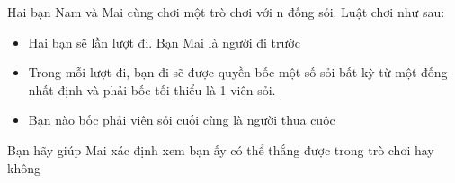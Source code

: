 Hai bạn Nam và Mai cùng chơi một trò chơi với n đống sỏi. Luật chơi như sau:
\begin{itemize}
	\item Hai bạn sẽ lần lượt đi. Bạn Mai là người đi trước
	\item Trong mỗi lượt đi, bạn đi sẽ được quyền bốc một số sỏi bất kỳ từ một đống nhất định và phải bốc tối thiểu là 1 viên sỏi.
	\item Bạn nào bốc phải viên sỏi cuối cùng là người thua cuộc
\end{itemize}

Bạn hãy giúp Mai xác định xem bạn ấy có thể thắng được trong trò chơi hay không